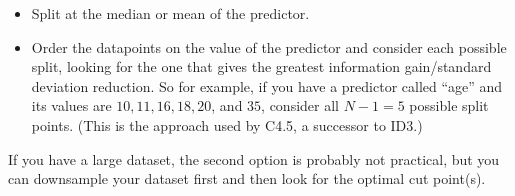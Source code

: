 \begin{itemize}
\item Split at the median or mean of the predictor.
\item Order the datapoints on the value of the predictor and consider each possible split, looking for the one that gives the greatest information gain/standard deviation reduction. So for example, if you have a predictor called ``age'' and its values are $10, 11, 16, 18, 20$, and $35$, consider all $N-1 = 5$ possible split points. (This is the approach used by C4.5, a successor to ID3.) 
\end{itemize}

If you have a large dataset, the second option is probably not practical, but you can downsample your dataset first and then look for the optimal cut point(s).


